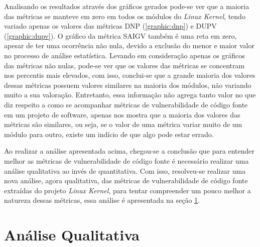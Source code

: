 Analisando os resultados através dos gráficos gerados pode-se ver que a maioria das métricas se manteve
em zero em todos os módulos do \emph{Linux Kernel}, tendo variado apenas os
valores das métricas DNP (\ref{graphic:dnp}) e DUPV (\ref{graphic:dupv}). O
gráfico da métrica SAIGV também é uma reta em zero, apesar de ter uma ocorrência
não nula, devido a exclusão do menor e maior valor no processo de análise
estatística. Levando em consideração apenas os gráficos das métricas não nulas, 
pode-se ver que os valores das métricas se concentram nos percentis mais elevados, 
com isso, conclui-se que a grande maioria dos valores dessas métricas possuem valores similares na
maioria dos módulos, não variando muito a sua valoração. Entretanto, essa
informação não agrega tanto valor no que diz respeito a como se acompanhar
métricas de vulnerabilidade de código fonte em um projeto de software, apenas nos mostra que a
maioria dos valores das métricas são similares, ou seja, se o valor de uma
métrica variar muito de um módulo para outro, existe um indício de que algo pode
estar errado.

Ao realizar a análise apresentada acima, chegou-se a conclusão que para entender
melhor as métricas de vulnerabilidade de código fonte é necessário realizar uma
análise qualitativa ao invés de quantitativa. Com isso, resolveu-se realizar uma
nova análise, agora qualitativa, das métricas de vulnerabilidade de código fonte
extraídas do projeto \emph{Linux Kernel}, para tentar compreender um pouco
melhor a natureza dessas métricas, essa análise é apresentada na seção
\ref{sec:analise_qualitativa}.

\section{Análise Qualitativa} \label{sec:analise_qualitativa}

